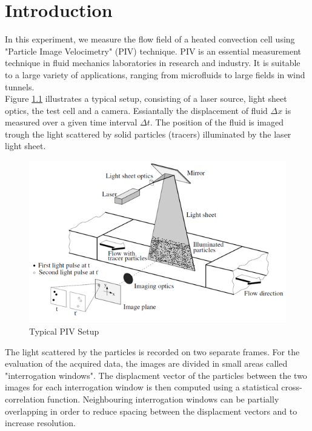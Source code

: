 \chapter{Introduction}\label{sec:introduction}

In this experiment, we measure the flow field of a heated convection cell using "Particle Image Velocimetry" (PIV) technique. PIV is an essential measurement technique in fluid mechanics laboratories in research and industry. It is suitable to a large variety of applications, ranging from microfluids to large fields in wind tunnels.\\

Figure \ref{pic:typsetup} illustrates a typical setup, consisting of a laser source, light sheet optics, the test cell and a camera. Essiantally the displacement of fluid $\Delta x$ is measured over a given time interval $\Delta t$. The position of the fluid is imaged trough the light scattered by solid particles (tracers) illuminated by the laser light sheet.\\

\begin{figure}[H]
\centering
\includegraphics[width=\textwidth]{pics/setup_schematic.png}
\caption{Typical PIV Setup}
\label{pic:typsetup}
\end{figure}

 The light scattered by the particles is recorded on two separate frames. For the evaluation of the acquired data, the images are divided in small areas called "interrogation windows". The displacment vector of the particles between the two images for each interrogation window is then computed using a statistical cross-correlation function. Neighbouring interrogation windows can be partially overlapping in order to reduce spacing between the displacment vectors and to increase resolution. 

